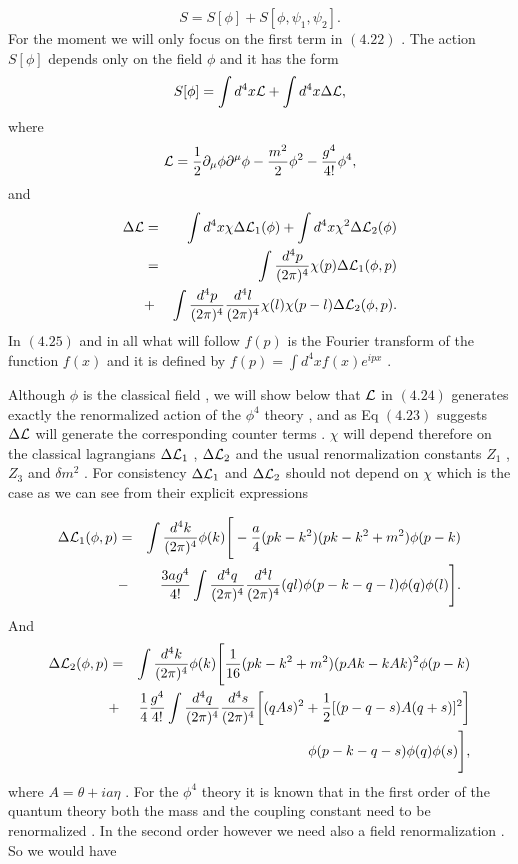 \documentclass[a4paper,12pt]{article}
\begin{document}
\begin{equation}
S=S[\phi]+S[\phi,{\psi}_1,{\psi}_2].
\end{equation}
For the moment we will only focus on the first term in $(4.22)$ .
The action $S[{\phi}]$ depends only on the field ${\phi}$ and it
has the form
\begin{equation}
S[\phi]=\int d^4x {\cal L} + \int d^4x {\Delta}{\cal L},
\end{equation}
where
\begin{equation}
{\cal L}=\frac{1}{2}{\partial}_{\mu}{\phi}{\partial}^{\mu}{\phi}
-\frac{m^2}{2}{\phi}^2 - \frac{g^4}{4!}{\phi}^4,
\end{equation}
and
\begin{eqnarray}
{\Delta}{\cal L}&=&\int d^4 x {\chi}{\Delta}{\cal L}_1({\phi}) + \int d^4x {\chi}^2 {\Delta}{\cal L}_2(\phi)\nonumber\\
&=&\int \frac{d^4p}{(2{\pi})^4} {\chi}(p){\Delta}{\cal
L}_1({\phi},p)\nonumber\\&+& \int \frac{d^4p}{(2{\pi})^4}
\frac{d^4l}{(2{\pi})^4} {\chi}(l){\chi}(p-l){\Delta}{\cal
L}_2({\phi},p).
\end{eqnarray}
In $(4.25)$ and in all what will follow $f(p)$ is the Fourier
transform of the function $f(x)$ and it is defined by $f(p)=\int
d^4x f(x) e^{ipx} $ . 

Although ${\phi}$ is the classical field , we will show below that ${\cal L}$ in $(4.24)$ generates exactly the renormalized action of the ${\phi}^4$ theory , and as Eq $(4.23)$ suggests ${\Delta}{\cal L}$ will generate the corresponding counter terms . ${\chi}$ will depend therefore on the classical lagrangians ${\Delta}{\cal L}_1$ ,
${\Delta}{\cal L}_2$ and the usual renormalization constants $Z_1$
, $Z_3$ and ${\delta}m^2$ . For consistency ${\Delta}{\cal L}_1$
and ${\Delta}{\cal L}_2$ should not depend on ${\chi}$ which is
the case as we can see from their explicit expressions

\begin{eqnarray}
{\Delta}{\cal L}_1(\phi,p)&=&\int \frac{d^4k}{(2{\pi})^4}{\phi}(k)\Bigg[-\frac{a}{4}(pk - k^2)(pk -k^2 + m^2){\phi}(p-k)\nonumber\\
&-&\frac{3ag^4}{4!} \int  \frac{d^4q}{(2{\pi})^4}
\frac{d^4l}{(2{\pi})^4}(ql){\phi}(p-k-q-l){\phi}(q){\phi}(l)\Bigg].
\end{eqnarray}
And
\begin{eqnarray}
{\Delta}{\cal L}_2(\phi,p)&=&\int \frac{d^4k}{(2{\pi})^4}{\phi}(k)\Bigg[\frac{1}{16}(pk-k^2+m^2)(pAk -kAk)^2{\phi}(p-k)\nonumber\\
&+&\frac{1}{4}\frac{g^4}{4!}\int\frac{d^4q}{(2{\pi})^4}\frac{d^4s}{(2{\pi})^4}\bigg[(qAs)^2+\frac{1}{2}[(p-q-s)A(q+s)]^2\bigg]\nonumber\\
&&{\phi}(p-k-q-s){\phi}(q){\phi}(s)\Bigg],
\end{eqnarray}
where $A={\theta}+ia{\eta}$ . For the ${\phi}^4$ theory it is
known that in the first order of the quantum theory both the mass
and the coupling constant need to be renormalized . In the second
order however we need also a field renormalization . So we would
have
\end{document}
